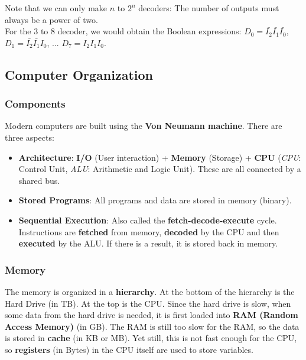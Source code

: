 \documentclass[]{article}
\begin{document}
Note that we can only make $n$ to $2^n$ decoders: The number of outputs must always be a power of two.\\

For the 3 to 8 decoder, we would obtain the Boolean expressions: $D_0 = \bar{I_2}\bar{I_1}\bar{I_0}$, $D_1 = \bar{I_2}\bar{I_1}I_0$, ... $D_7 = I_2I_1I_0$.\\

\subsection{Computer Organization}
\bigbreak
\subsubsection{Components}
\bigbreak

Modern computers are built using the \textbf{Von Neumann machine}. There are three aspects:

\begin{itemize}
	\item \textbf{Architecture}: \textbf{I/O} (User interaction) + \textbf{Memory} (Storage) + \textbf{CPU} (\textit{CPU}: Control Unit, \textit{ALU}: Arithmetic and Logic Unit). These are all connected by a shared bus.
	\item \textbf{Stored Programs}: All programs and data are stored in memory (binary).
	\item \textbf{Sequential Execution}: Also called the \textbf{fetch-decode-execute} cycle. Instructions are \textbf{fetched} from memory, \textbf{decoded} by the CPU and then \textbf{executed} by the ALU. If there is a result, it is stored back in memory. \smallskip
\end{itemize}

\subsubsection{Memory}
\bigbreak

The memory is organized in a \textbf{hierarchy}. At the bottom of the hierarchy is the Hard Drive (in TB). At the top is the CPU. Since the hard drive is slow, when some data from the hard drive is needed, it is first loaded into \textbf{RAM (Random Access Memory)} (in GB). The RAM is still too slow for the RAM, so the data is stored in \textbf{cache} (in KB or MB). Yet still, this is not fast enough for the CPU, so \textbf{registers} (in Bytes) in the CPU itself are used to store variables.
\end{document}
